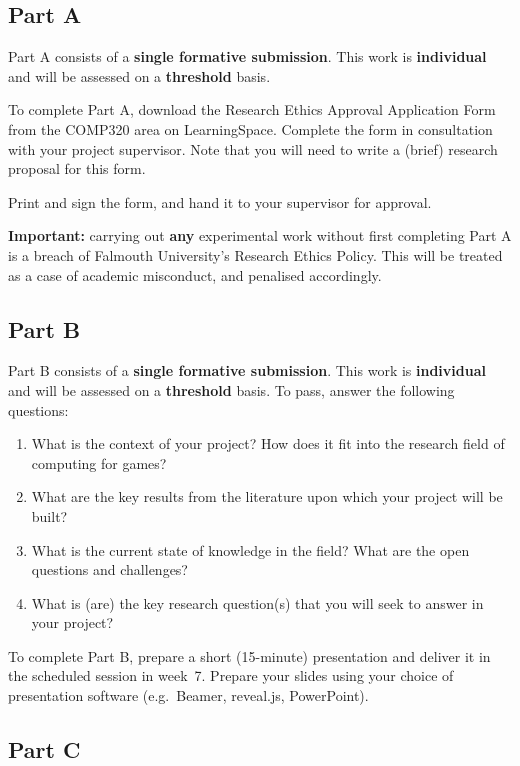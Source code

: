 \documentclass{../fal_assignment}
\begin{document}
\subsection*{Part A}

Part A consists of a \textbf{single formative submission}.
This work is \textbf{individual} and will be assessed on a \textbf{threshold} basis.

To complete Part A, download the Research Ethics Approval Application Form
from the COMP320 area on LearningSpace.
Complete the form in consultation with your project supervisor.
Note that you will need to write a (brief) research proposal for this form.

Print and sign the form, and hand it to your supervisor for approval.

\textbf{Important:} carrying out \textbf{any} experimental work
without first completing Part A is a breach of Falmouth University's Research Ethics Policy.
This will be treated as a case of academic misconduct, and penalised accordingly.

\subsection*{Part B}

Part B consists of a \textbf{single formative submission}.
This work is \textbf{individual} and will be assessed on a \textbf{threshold} basis.
To pass, answer the following questions:

\begin{enumerate}[label=(\roman*)]
	\item What is the context of your project? How does it fit into the
		research field of computing for games?
	\item What are the key results from the literature upon which your project will be built?
	\item What is the current state of knowledge in the field?
		What are the open questions and challenges?
	\item What is (are) the key research question(s) that you will seek to
		answer in your project?
\end{enumerate}

To complete Part B, prepare a short (15-minute) presentation 
and deliver it in the scheduled session in week~7.
Prepare your slides using your choice of presentation software
(e.g.\ Beamer, reveal.js, PowerPoint).

\subsection*{Part C}
\end{document}
